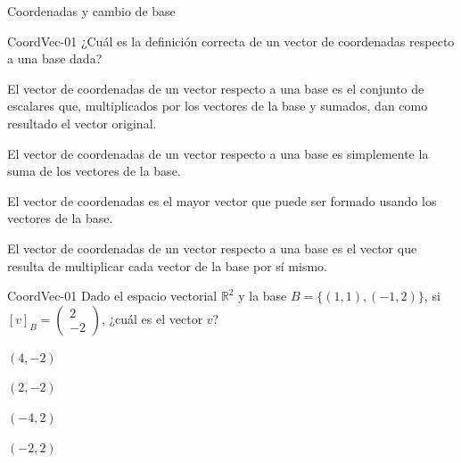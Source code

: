 \documentclass[a4,11pt]{aleph-notas}
\begin{document}
\begin{quiz}{Coordenadas y cambio de base}

\begin{multi}[]%
    {CoordVec-01}
    ¿Cuál es la definición correcta de un vector de coordenadas respecto a una base dada?
    \item* El vector de coordenadas de un vector respecto a una base es el conjunto de escalares que, multiplicados por los vectores de la base y sumados, dan como resultado el vector original.
    \item El vector de coordenadas de un vector respecto a una base es simplemente la suma de los vectores de la base.
    \item El vector de coordenadas es el mayor vector que puede ser formado usando los vectores de la base.
    \item El vector de coordenadas de un vector respecto a una base es el vector que resulta de multiplicar cada vector de la base por sí mismo.
\end{multi}


\begin{multi}[]%
    {CoordVec-01}
    Dado el espacio vectorial \( \mathbb{R}^2 \) y la base \( B = \{(1, 1), (-1, 2)\} \), si $[v]_B = \begin{pmatrix}2\\-2\end{pmatrix}$, ¿cuál es el vector $v$?
    \item* $(4, -2)$
    \item $(2,-2)$
    \item $(-4, 2)$
    \item $(-2,2)$
\end{multi}


\end{quiz}



\end{document}
